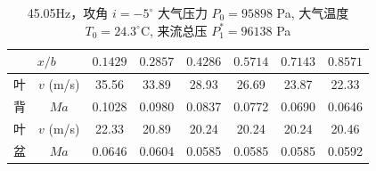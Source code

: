 \begin{table}[H]
  \centering
  \caption[45.05Hz 攻角 $i=-5^\circ$ v/Ma 数据]{45.05Hz，攻角 $i=-5^\circ$ 大气压力 $P_0=95898$ Pa, 大气温度 $T_0=24.3^\circ\text{C}$, 来流总压 $P_1^*=96138$ Pa}
  \label{tab:exp4_vma_45.05Hz_-5}
  \renewcommand{\arraystretch}{1.2}
  \begin{tabular}{cccccccc}
    \toprule
    \multicolumn{2}{c}{$x/b$} & $0.1429$ & $0.2857$ & $0.4286$ & $0.5714$ & $0.7143$ & $0.8571$ \\
    \midrule
    叶 & $v$ (m/s) & 35.56 & 33.89 & 28.93 & 26.69 & 23.87 & 22.33 \\
    背 & $Ma$ & 0.1028 & 0.0980 & 0.0837 & 0.0772 & 0.0690 & 0.0646 \\
    \midrule
    叶 & $v$ (m/s) & 22.33 & 20.89 & 20.24 & 20.24 & 20.24 & 20.46 \\
    盆 & $Ma$ & 0.0646 & 0.0604 & 0.0585 & 0.0585 & 0.0585 & 0.0592 \\
    \bottomrule
  \end{tabular}
\end{table}